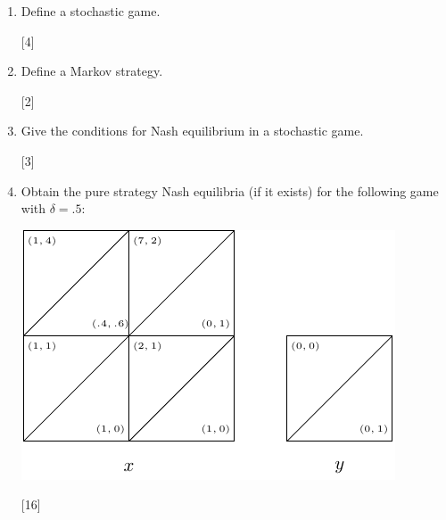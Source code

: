 \documentclass[12pt,a4paper]{article}
\makeatletter
\renewcommand{\@oddfoot}{\hfil \arabic{page} \hfil}    %
\makeatother
\begin{document}
\begin{enumerate}
\begin{enumerate}
        \item Define a stochastic game.

        \hfill[4]

        \item Define a Markov strategy.

        \hfill[2]

        \item Give the conditions for Nash equilibrium in a stochastic game.

        \hfill[3]

        \item Obtain the pure strategy Nash equilibria (if it exists) for the following game with \(\delta=.5\):

        \begin{center}
            \includegraphics[width=.8\textwidth]{images/mock-img04.pdf}
        \end{center}

        \hfill[16]

    \end{enumerate}
\end{enumerate}


\makeatletter
\renewcommand{\@oddfoot}{\hfil \arabic{page}X \hfil}    %
\makeatother
\end{document}
